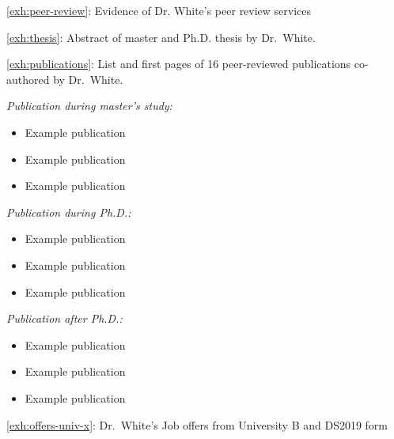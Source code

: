 \documentclass{article}
\newcommand{\lname}{White}
\newcommand{\drfn}{Dr.~\lname}
\newcommand{\numpubs}{16}
\newcounter{exhibit}
\begin{document}
\pagebreak
\begin{center}
    \Large{\ref{exh:peer-review}:  Evidence of Dr. \lname{}’s peer review services }
\end{center}

% 
\pagebreak

\begin{center}
    \Large{\ref{exh:thesis}:  Abstract of master and Ph.D. thesis by \drfn.}
\end{center}
% 
\pagebreak

\begin{center}
    \Large{{\ref{exh:publications}: List and first pages of \numpubs{} peer-reviewed publications co-authored by \drfn.}}
\end{center}

\emph{Publication during master's study:}\vspace{-1em}
\begin{itemize}
    \item Example publication
    \item Example publication
    \item Example publication
\end{itemize}
\emph{Publication during Ph.D.:}\vspace{-1em}
\begin{itemize}
    \item Example publication
    \item Example publication
    \item Example publication
\end{itemize}
\emph{Publication after Ph.D.:}\vspace{-1em}
\begin{itemize}
    \item Example publication
    \item Example publication
    \item Example publication
\end{itemize}

\pagebreak
% 



\begin{center}
    \Large{\ref{exh:offers-univ-x}: \drfn's Job offers from University B and DS2019 form}
\end{center}
% 
\pagebreak
\end{document}
